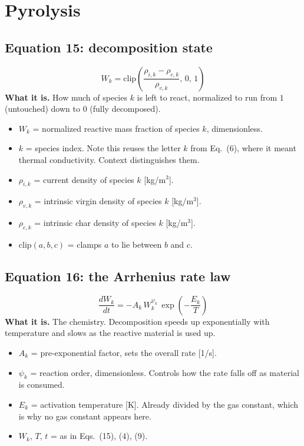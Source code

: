 \documentclass[11pt]{article}
\begin{document}
\section{Pyrolysis}

\subsection*{Equation 15: decomposition state}
\begin{equation}
W_k = \mathrm{clip}\!\left(\frac{\rho_{i,k} - \rho_{c,k}}{\rho_{v,k}},\, 0,\, 1\right)
\end{equation}
\textbf{What it is.} How much of species $k$ is left to react, normalized to run
from $1$ (untouched) down to $0$ (fully decomposed).
\begin{itemize}
  \item $W_k$ = normalized reactive mass fraction of species $k$, dimensionless.
  \item $k$ = species index. Note this reuses the letter $k$ from Eq.~(6), where
        it meant thermal conductivity. Context distinguishes them.
  \item $\rho_{i,k}$ = current density of species $k$ [kg/m$^3$].
  \item $\rho_{v,k}$ = intrinsic virgin density of species $k$ [kg/m$^3$].
  \item $\rho_{c,k}$ = intrinsic char density of species $k$ [kg/m$^3$].
  \item $\mathrm{clip}(a,b,c)$ = clamps $a$ to lie between $b$ and $c$.
\end{itemize}

\subsection*{Equation 16: the Arrhenius rate law}
\begin{equation}
\frac{dW_k}{dt} = -A_k\, W_k^{\psi_k}\, \exp\!\left(-\frac{E_k}{T}\right)
\end{equation}
\textbf{What it is.} The chemistry. Decomposition speeds up exponentially with
temperature and slows as the reactive material is used up.
\begin{itemize}
  \item $A_k$ = pre-exponential factor, sets the overall rate [1/s].
  \item $\psi_k$ = reaction order, dimensionless. Controls how the rate falls off
        as material is consumed.
  \item $E_k$ = activation temperature [K]. Already divided by the gas constant,
        which is why no gas constant appears here.
  \item $W_k$, $T$, $t$ = as in Eqs.~(15), (4), (9).
\end{itemize}
\end{document}

